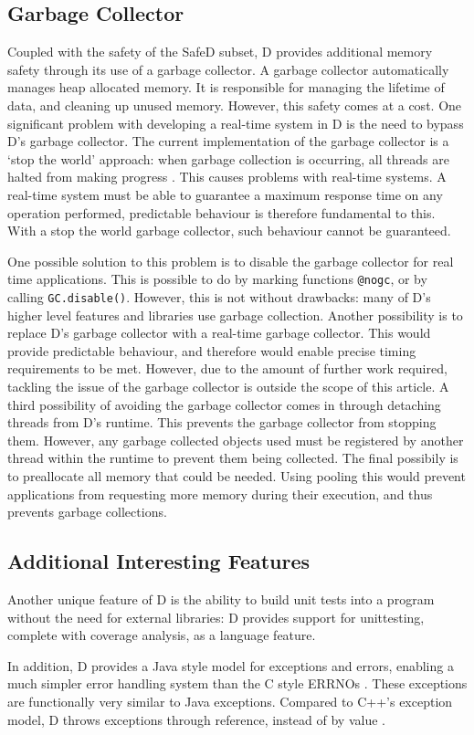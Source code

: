 \subsection{Garbage Collector}
Coupled with the safety of the SafeD subset, D provides additional memory
safety through its use of a garbage collector. A garbage collector
automatically manages heap allocated memory. It is responsible for managing
the lifetime of data, and cleaning up unused memory. 
However, this safety comes at a cost. One significant problem with developing a 
real-time system in D is the need to bypass D's garbage collector. 
The current implementation of the garbage 
collector is a `stop the world' approach: when garbage collection is occurring, 
all threads are halted from making progress 
\cite{dlang-garbage}. This causes problems with 
real-time systems. A real-time system must be able to guarantee a maximum response 
time on any operation performed, predictable behaviour is therefore fundamental to this. 
With a stop the world garbage collector, such behaviour cannot be guaranteed. 
\par\bigskip\noindent
One possible solution to this problem is to disable the garbage collector for 
real time applications. This is possible to do by marking functions \texttt{@nogc}, 
or by calling \texttt{GC.disable()}. However, this is not without drawbacks: 
many of D's higher level features and libraries use garbage collection. 
Another possibility is to replace D's garbage collector with a real-time 
garbage collector. This would provide predictable behaviour, and therefore
would enable precise timing requirements to be met.
However, due to the amount of further work required, tackling the issue of the garbage 
collector is outside the scope of this article.
A third possibility of avoiding the garbage collector comes in through
detaching threads from D's runtime. This prevents the garbage collector from
stopping them. However, any garbage collected objects used must be registered
by another thread within the runtime to prevent them being collected. 
The final possibily is to preallocate all memory that could be needed. Using
pooling this would prevent applications from requesting more memory during
their execution, and thus prevents garbage collections. 

\subsection{Additional Interesting Features}
Another unique feature of D is the ability to build unit tests into a 
program without the need for external libraries: D provides support for 
unittesting, complete with coverage analysis, as a language feature. 
\par\bigskip\noindent
In addition, D provides a Java style model for exceptions and errors, enabling 
a much simpler error handling system than the C style ERRNOs 
\cite{ddili-book}. 
These exceptions are functionally very similar to Java exceptions. Compared to
C++'s exception model, D throws exceptions through reference, instead of by
value \cite{interface-to-cpp}. 


